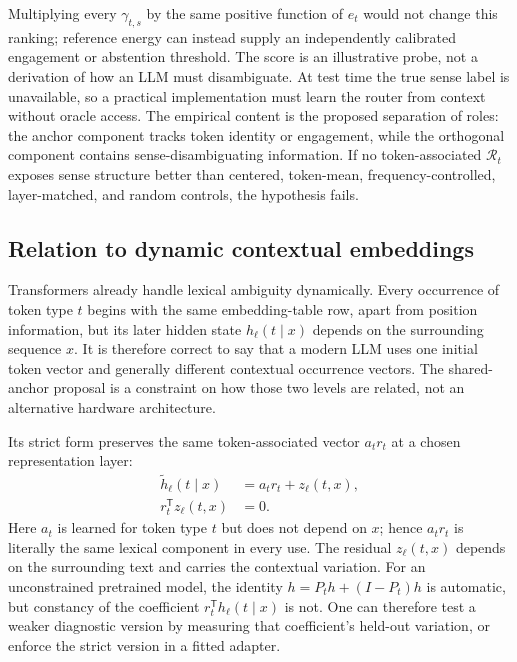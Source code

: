 \documentclass[
  aps,
  reprint,
  superscriptaddress,
  floatfix,
  nofootinbib,
  longbibliography
]{revtex4-2}
\newcommand{\T}{^{\mathsf{T}}}
\begin{document}
%
Multiplying every $\gamma_{t,s}$ by the same positive function of $e_t$ would not
change this ranking; reference energy can instead supply an independently
calibrated engagement or abstention threshold.  The score is an illustrative
probe, not a derivation of how an LLM
must disambiguate.  At test time the true sense label is unavailable, so a
practical implementation must learn the router from context without oracle
access.  The empirical content is the proposed separation of roles: the
anchor component tracks token identity or engagement, while the orthogonal
component contains sense-disambiguating information. If no token-associated
$\mathcal R_t$ exposes sense structure better than centered, token-mean,
frequency-controlled, layer-matched, and random controls, the hypothesis
fails.

\subsection{Relation to dynamic contextual embeddings}
\label{sec:dynamic}

Transformers already handle lexical ambiguity dynamically.  Every occurrence
of token type $t$ begins with the same embedding-table row, apart from position
information, but its later hidden state $h_\ell(t\mid x)$ depends on the
surrounding sequence $x$.  It is therefore correct to say that a modern LLM
uses one initial token vector and generally different contextual occurrence
vectors.  The shared-anchor proposal is a constraint on how those two levels
are related, not an alternative hardware architecture.

Its strict form preserves the same token-associated vector $a_t r_t$ at a
chosen representation layer:
%
\begin{align}
\label{eq:layer-decomp}
\widetilde h_\ell(t\mid x)
&=a_t r_t+z_\ell(t,x),\\
r_t\T z_\ell(t,x)&=0 .\nonumber
\end{align}
%
Here $a_t$ is learned for token type $t$ but does not depend on $x$; hence
$a_t r_t$ is literally the same lexical component in every use.  The residual
$z_\ell(t,x)$ depends on the surrounding text and carries the contextual
variation.  For an unconstrained pretrained model, the identity
$h=P_th+(I-P_t)h$ is automatic, but constancy of the coefficient
$r_t\T h_\ell(t\mid x)$ is not.  One can therefore test a weaker diagnostic
version by measuring that coefficient's held-out variation, or enforce the
strict version in a fitted adapter.
\end{document}
